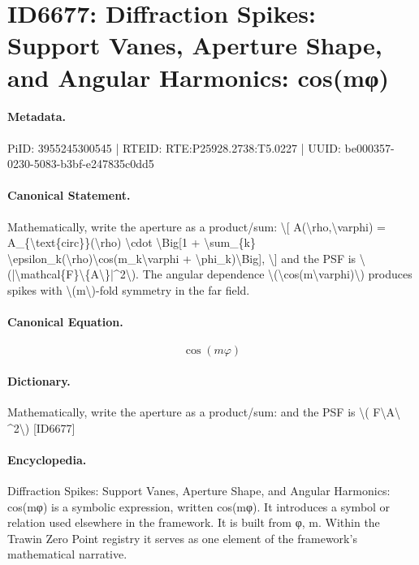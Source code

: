 \section*{ID6677: Diffraction Spikes: Support Vanes, Aperture Shape, and Angular Harmonics: cos(mφ)}
\paragraph{Metadata.}
PiID: 3955245300545 | RTEID: RTE:P25928.2738:T5.0227 | UUID: be000357-0230-5083-b3bf-e247835c0dd5

\paragraph{Canonical Statement.}
Mathematically, write the aperture as a product/sum: \textbackslash{}[ A(\textbackslash{}rho,\textbackslash{}varphi) = A\_\{\textbackslash{}text\{circ\}\}(\textbackslash{}rho) \textbackslash{}cdot \textbackslash{}Big[1 + \textbackslash{}sum\_\{k\} \textbackslash{}epsilon\_k(\textbackslash{}rho)\textbackslash{}cos(m\_k\textbackslash{}varphi + \textbackslash{}phi\_k)\textbackslash{}Big], \textbackslash{}] and the PSF is \textbackslash{}(|\textbackslash{}mathcal\{F\}\textbackslash{}\{A\textbackslash{}\}|\textasciicircum{}2\textbackslash{}). The angular dependence \textbackslash{}(\textbackslash{}cos(m\textbackslash{}varphi)\textbackslash{}) produces spikes with \textbackslash{}(m\textbackslash{})-fold symmetry in the far field.

\paragraph{Canonical Equation.}
\[
\cos(m\varphi)
\]

\paragraph{Dictionary.}
Mathematically, write the aperture as a product/sum: and the PSF is \textbackslash{}( F\textbackslash{}A\textbackslash{} \textasciicircum{}2\textbackslash{}) [ID6677]

\paragraph{Encyclopedia.}
Diffraction Spikes: Support Vanes, Aperture Shape, and Angular Harmonics: cos(mφ) is a symbolic expression, written cos(mφ). It introduces a symbol or relation used elsewhere in the framework. It is built from φ, m. Within the Trawin Zero Point registry it serves as one element of the framework's mathematical narrative.
